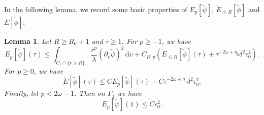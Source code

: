\documentclass[10pt, reqno]{amsart}
\newtheorem{lemma}[theorem]{Lemma}
\theoremstyle{definition}
\theoremstyle{remark}
\theoremstyle{conjecture}
\numberwithin{equation}{section}
\newcommand{\set}[1]{\{#1\}}
\newcommand{\ud}{\mathrm{d}}
\newcommand{\rd}{\partial}
\newcommand{\0}{\emptyset}
\newcommand{\Gmm}{\Gamma}
\newcommand{\dlt}{\delta}
\newcommand{\eps}{\epsilon}
\newcommand{\lmb}{\lambda}
\newcommand{\omg}{\omega}
\newcommand{\dvr}{\lmb}
\newcommand{\phibg}{\overline{\phi}}				%
\newcommand{\psibg}{\overline{\psi}}				%
\newcommand{\phidf}{\widetilde{\phi}}				%
\newcommand{\psidf}{\widetilde{\psi}}				%
\begin{document}
In the following lemma, we record some basic properties of $E_{p}[\psidf]$, $\dot{E}_{\leq R}[\phidf]$ and $\dot{E}[\phidf]$.
\begin{lemma} \label{lem:Ep}
Let $R \geq R_{0} + 1$ and $\tau \geq 1$. For $p \geq -1$, we have
\begin{equation} 	
	E_{p}[\psidf](\tau) 
	\leq  \int_{C_{\tau} \cap \set{r \geq R}} \frac{r^{p}}{\dvr} (\rd_{v} \psidf)^{2} \, \ud v + C_{R, p} \left( \dot{E}_{\leq R}[\phidf](\tau) + \tau^{-2 \omg + \eta_{0}} \dlt^{2} \eps_{0}^{2} \right). 				\label{eq:Ep-dotE}  
\end{equation}
For $p \geq 0$, we have
\begin{equation} 
	\dot{E}[\phidf](\tau) \leq C E_{p}[\psidf](\tau) + C \tau^{-2 \omg + \eta_{0}} \dlt^{2} \eps_{0}^{2}. \label{eq:dotE-Ep}
\end{equation}
Finally, let $p < 2 \omg - 1$. Then on $\Gmm_{1}$ we have
\begin{equation} \label{eq:Ep-eps0}
	E_{p}[\psidf](1) \leq C \eps_{0}^{2}.
\end{equation}
\end{lemma}
\end{document}
